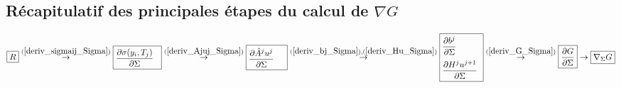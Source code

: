 \subsection*{R\'ecapitulatif des principales \'etapes du calcul de 
$\nabla G$\label{gradG}}

\setlength{\fboxsep}{3pt}
\begin{equation*}
\text{\framebox{$R$}} 
\overset{(\ref{deriv_sigmaij_Sigma})}{\rightarrow} 
\text{\fbox{\parbox[c]{1.8cm}{${\disp\frac{\partial 
\sigma(y_i,T_j)}{\partial \Sigma}}$}}}
\overset{(\ref{deriv_Ajuj_Sigma})}{\rightarrow}
\text{\fbox{\parbox[c]{1.5cm}{${\disp\frac{\partial \hat{A}^ju^j}
{\partial \Sigma}}$}}}
\overset{(\ref{deriv_bj_Sigma}),(\ref{deriv_Hu_Sigma})}{\rightarrow} 
\text{\fbox{\parbox[c]{1.6cm}{${\disp\frac{\partial b^j}
{\partial \Sigma}}$\vspace*{2mm} ${\disp\frac{\partial H^ju^{j+1}}
{\partial \Sigma}}$}}}
\overset{(\ref{deriv_G_Sigma})}{\rightarrow} 
\text{\framebox{${\disp\frac{\partial G}{\partial \Sigma}}$}}
\rightarrow 
\text{\framebox{${\disp \nabla_{\Sigma}G}$}}
\end{equation*}
